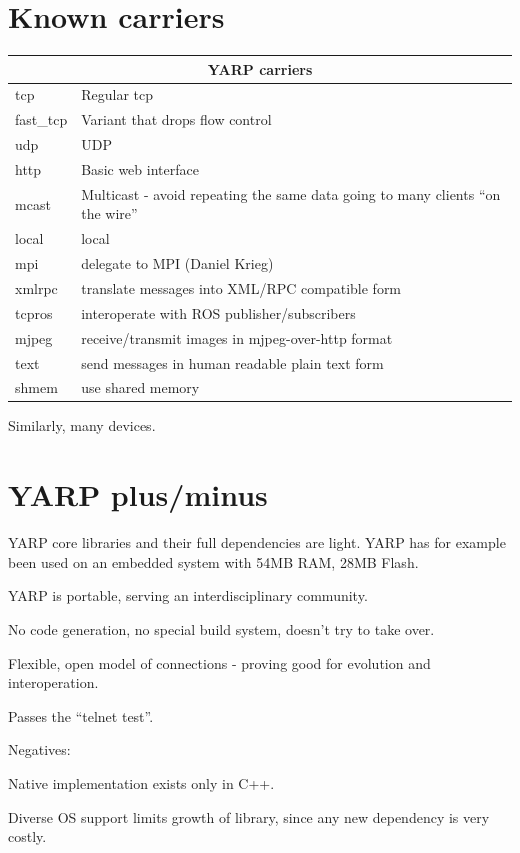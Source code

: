 \documentclass[letterpaper]{article}
\begin{document}
\section{Known carriers}

\begin{tabular}{|l|p{7cm}|}
\hline
\multicolumn{2}{|c|}{YARP carriers} \\
\hline
tcp & Regular tcp \\
fast\_tcp & Variant that drops flow control \\
udp & UDP \\
http & Basic web interface \\
mcast & Multicast - avoid repeating the same data going
to many clients ``on the wire''  \\
local & local \\
mpi & delegate to MPI (Daniel Krieg) \\
xmlrpc & translate messages into XML/RPC compatible form \\
tcpros & interoperate with ROS publisher/subscribers \\
mjpeg & receive/transmit images in mjpeg-over-http format \\
text & send messages in human readable plain text form \\
shmem & use shared memory \\
\hline
\end{tabular}

Similarly, many devices.


\section{YARP plus/minus}

YARP core libraries and their full dependencies are light.
YARP has for example been used on an embedded system
with 54MB RAM, 28MB Flash.

YARP is portable, serving an interdisciplinary community.

No code generation, no special build system, doesn't try to take over.

Flexible, open model of connections - proving good for evolution and interoperation.

Passes the ``telnet test''.

Negatives:

Native implementation exists only in C++.  

Diverse OS support limits growth of library, since any
new dependency is very costly.
\end{document}
